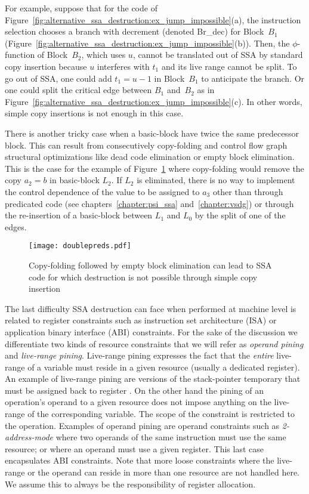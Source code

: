 For example, suppose that for the code of
Figure~\ref{fig:alternative_ssa_destruction:ex_jump_impossible}(a), the instruction selection chooses a branch
with decrement (denoted Br\_dec) for Block~$B_1$
(Figure~\ref{fig:alternative_ssa_destruction:ex_jump_impossible}(b)).  Then, the $\phi$-function of
Block~$B_2$, which uses $u$, cannot be translated out of SSA by standard copy
insertion because $u$ interferes with $t_1$ and its live range cannot be split.
To go out of SSA, one could add $t_1=u-1$ in Block~$B_1$ to anticipate the
branch. Or one could split the critical edge between $B_1$ and~$B_2$ as in
Figure~\ref{fig:alternative_ssa_destruction:ex_jump_impossible}(c). In other words, simple copy insertions is not enough in this case.


There is another tricky case when a basic-block have twice the same predecessor block. This can result from consecutively copy-folding and control flow graph structural optimizations like dead code elimination or empty block elimination. This is the case for the example of Figure~\ref{fig:alternative_ssa_destruction:doublepreds} where copy-folding would remove the copy $a_2=b$ in basic-block $L_2$. If $L_2$ is eliminated, there is no way to implement the control dependence of the value to be assigned to $a_3$ other than through predicated code (see chapters~\ref{chapter:psi_ssa} and~\ref{chapter:vsdg}) or through the re-insertion of a basic-block between $L_1$ and $L_0$ by the split of one of the edges.

\begin{figure}[H]
\texttt{[image: doublepreds.pdf]}
\caption{\label{fig:alternative_ssa_destruction:doublepreds} Copy-folding followed by empty block elimination can lead to SSA code for which destruction is not possible through simple copy insertion}
\end{figure}

The last difficulty SSA destruction can face when performed at machine level is related to register constraints such as instruction set architecture (ISA) or application binary interface (ABI) constraints. For the sake of the discussion we differentiate two kinds of resource constraints that we will refer as \emph{operand pining} and \emph{live-range pining}. Live-range pining expresses the fact that the \emph{entire} live-range of a variable must reside in a given resource (usually a dedicated register). An example of live-range pining are versions of the stack-pointer temporary that must be assigned back to register \SP. On the other hand the pining of an operation's operand to a given resource does not impose anything on the live-range of the corresponding variable. The scope of the constraint is restricted to the operation. Examples of operand pining are operand constraints such as \emph{2-address-mode} where two operands of the same instruction must use the same resource; or where an operand must use a given register. This last case encapsulates ABI constraints. 
Note that more loose constraints where the live-range or the operand can reside in more than one resource are not handled here. We assume this to always be the responsibility of register allocation.

